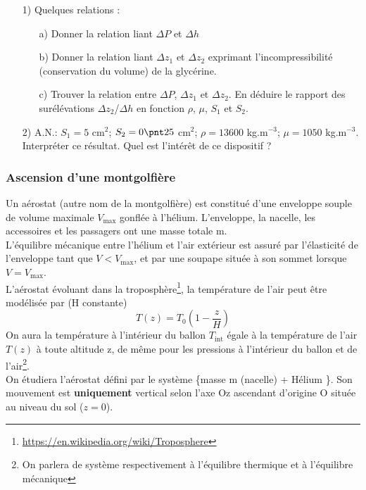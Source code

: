 \documentclass[a4paper,12pt]{article}
\newcommand{\bepar}[1]{
	\left( #1 \right)  
}
\newcommand\bk{\color{black}}
\newcommand\navy{\color{navy}}
\begin{document}
\begin{itemize}[leftmargin=1.4cm]
	\item[1)] Quelques relations :
	\begin{itemize}
		\item[a)] Donner la relation liant $\Delta P$ et $\Delta h$
		\item[b)] Donner la relation liant $\Delta z_1$ et $\Delta z_2$ exprimant l'incompressibilité (conservation du volume) de la glycérine.
		\item[c)] Trouver la relation entre $\Delta P$, $\Delta z_1$ et $\Delta z_2$. En déduire le rapport des surélévations $\Delta z_2$/$\Delta h$ en fonction $\rho$, $\mu$, $S_1$ et $S_2$. 
	\end{itemize} 

	\item[2)] A.N.: $S_1 = 5$ cm$^2$;  $S_2 = 0\pnt25$ cm$^2$; $\rho = 13600$ kg.m$^{-3}$; $\mu=1050$ kg.m$^{-3}$.\\[2mm]
	Interpréter ce résultat. Quel est l'intérêt de ce dispositif ?
	
\end{itemize}

\navy \subsubsection*{Ascension d'une montgolfière} \bk
Un aérostat (autre nom de la montgolfière) est constitué d'une enveloppe souple de volume maximale $V_{\text{max}}$ gonflée à l'hélium. L'enveloppe, la nacelle, les accessoires et les passagers ont une masse totale m.\\
L'équilibre mécanique entre l'hélium et l'air extérieur est assuré par l'élasticité de l'enveloppe tant que $V<V_{\text{max}}$, et par une soupape située à son sommet lorsque $V=V_{\text{max}}$.\\[2mm]
L'aérostat évoluant dans la troposphère\footnote{\url{https://en.wikipedia.org/wiki/Troposphere}}, la température de l'air peut être modélisée par (H constante) $$T(z) = T_0 \bepar{1 - \frac{z}{H}} $$
On aura la température à l'intérieur du ballon $T_{\text{int}}$ égale à la température de l'air $T(z)$ à toute altitude z, de même pour les pressions à l'intérieur du ballon et de l'air\footnote{On parlera de système respectivement à l'équilibre thermique et à l'équilibre mécanique}.\\

On étudiera l'aérostat défini par le système \{masse m (nacelle) + Hélium \}. Son mouvement est \textbf{uniquement} vertical selon l'axe Oz ascendant d'origine O située au niveau du sol ($z=0$).\\
\end{document}
